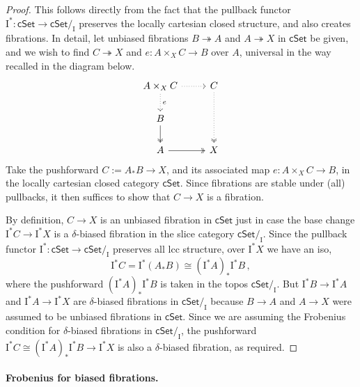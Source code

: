 \documentclass[12pt]{article}
\newcommand{\bbC}{\ensuremath{\mathbb{C}}}
\newcommand{\cSet}{\ensuremath{\mathsf{cSet}}}
\newcommand{\fib}{\ensuremath{\twoheadrightarrow}}
\renewcommand{\to}{\ensuremath{\rightarrow}}
\newcommand{\I}{\ensuremath{\mathrm{I}}}
\theoremstyle{remark}
\theoremstyle{definition}
\begin{document}
\begin{proof}
This follows directly from the fact that the pullback functor $\I^* : \cSet \to \cSet/_\I$ preserves the locally cartesian closed structure, and also creates fibrations.  In detail, let unbiased fibrations $B \fib A$ and $A \fib X$ in $\cSet$ be given, and we wish to find $C\fib X$ and $e : A\times_X C \to B$ over $A$, universal in the way recalled in the diagram below.
\begin{equation}\label{diagram:biasedFrobenius2unbiasedFrobenius}
\begin{tikzcd}
A \times_X C \ar[d, dotted, "e"] \ar[r, dotted] & C \ar[dd, two heads, dotted]\\
B \ar[d, two heads] &   \\
A \ar[r, two heads]  & X 
\end{tikzcd}
\end{equation}
%
Take the pushforward $C := A_*B \to X$, and its associated map $e : A\times_X C \to B$, in the locally cartesian closed category $\cSet$.  Since fibrations are stable under (all) pullbacks, %
it then suffices to show that $C\to X$ is a fibration.  

By definition, $C\to X$ is an unbiased fibration in $\cSet$ just in case the base change $\I^*C \to \I^*X$ is a $\delta$-biased fibration in the slice category $\cSet/_\I$.  Since the pullback functor $\I^* : \cSet \to \cSet/_\I$ preserves all lcc structure, over $\I^*X$ we have an iso,
\[
\I^*C = \I^*(A_*B) \cong (\I^*A)_*\I^*B\,,
\]
where the pushforward $(\I^*A)_*\I^*B$ is taken in the topos $\cSet/_\I$.  But $\I^*B \to \I^*A$ and $\I^*A \to \I^*X$ are $\delta$-biased fibrations in $\cSet/_\I$ because $B \to A$ and $A \to X$ were assumed to be unbiased fibrations in $\cSet$.  Since we are assuming the Frobenius condition for $\delta$-biased fibrations in $\cSet/_\I$, the pushforward $\I^*C \cong (\I^*A)_*\I^*B \to \I^*X$ is also a $\delta$-biased fibration, as required.
\end{proof}
  
\paragraph{Frobenius for biased fibrations.}
\end{document}
